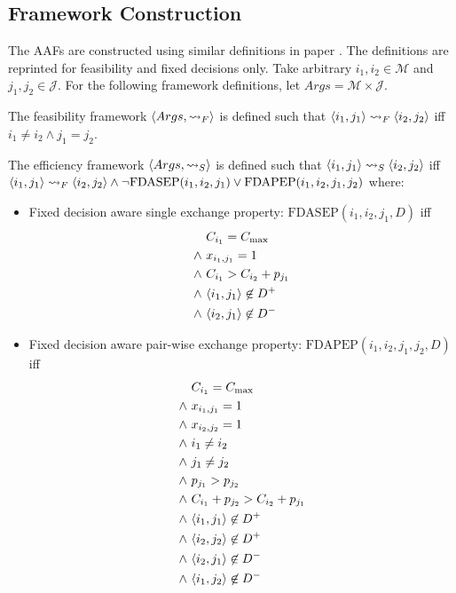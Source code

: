 \subsection{Framework Construction}
\label{frameworkconstruction}

The AAFs are constructed using similar definitions in paper \cite{aes}. The definitions are reprinted for feasibility and fixed decisions only. Take arbitrary $i_1,i_2\in\mathcal{M}$ and $j_1,j_2\in\mathcal{J}$. For the following framework definitions, let $Args=\mathcal{M}\times\mathcal{J}$.

\begin{definition}
	\label{feasibilityframework}
	
	The feasibility framework $\langle{Args},{\rightsquigarrow_F}\rangle$ is defined such that $\langle{i_1},{j_1}\rangle\rightsquigarrow_F\langle{i_2},{j_2}\rangle$ iff $i_1\neq i_2\land j_1=j_2$.
\end{definition}

\begin{definition}
	\label{efficiencyframework}

	The efficiency framework $\langle{Args},{\rightsquigarrow_S}\rangle$ is defined such that $\langle{i_1},{j_1}\rangle\rightsquigarrow_S\langle{ i_2},{j_2}\rangle$ iff $\langle{i_1},{j_1}\rangle\rightsquigarrow_F\langle{i_2},{j_2}\rangle\land\neg\text{FDASEP}(i_1,i_2,j_1)\lor\text{FDAPEP}(i_1,i_2,j_1,j_2)$ where:
	\begin{itemize}
		\item Fixed decision aware single exchange property: $\text{FDASEP}(i_1,i_2,j_1, D)$ iff
			\begin{align*}
				&C_{i_1}=C_{\max}\\
				\land\ &x_{i_1,j_1}=1\\
				\land\ &C_{i_1}>C_{i_2}+p_{j_1}\\
				\land\ &\langle{i_1},{j_1}\rangle\not\in D^+\\
				\land\ &\langle{i_2},{j_1}\rangle\not\in D^-
			\end{align*}
		\item Fixed decision aware pair-wise exchange property: $\text{FDAPEP}(i_1,i_2,j_1,j_2, D)$ iff
			\begin{align*}
				&C_{i_1}=C_{\max}\\
				\land\ &x_{i_1,j_1}=1\\
				\land\ &x_{i_2,j_2}=1\\
				\land\ &i_1\neq i_2\\
				\land\ &j_1\neq j_2\\
				\land\ &p_{j_1}>p_{j_2}\\
				\land\ &C_{i_1}+p_{j_2}>C_{i_2}+p_{j_1}\\
				\land\ &\langle{i_1},{j_1}\rangle\not\in D^+\\
				\land\ &\langle{i_2},{j_2}\rangle\not\in D^+\\
				\land\ &\langle{i_2},{j_1}\rangle\not\in D^-\\
				\land\ &\langle{i_1},{j_2}\rangle\not\in D^-
			\end{align*}
	\end{itemize}
\end{definition}


